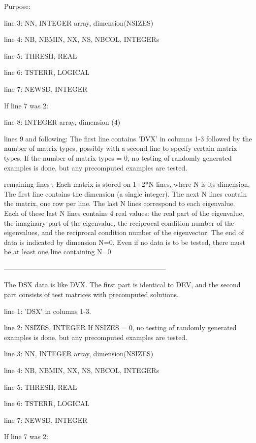 \begin{DoxyParagraph}{Purpose\+: }
\begin{DoxyVerb}
 line 3:  NN, INTEGER array, dimension(NSIZES)

 line 4:  NB, NBMIN, NX, NS, NBCOL, INTEGERs

 line 5:  THRESH, REAL

 line 6:  TSTERR, LOGICAL

 line 7:  NEWSD, INTEGER

 If line 7 was 2:

 line 8:  INTEGER array, dimension (4)

 lines 9 and following: The first line contains 'DVX' in columns 1-3
          followed by the number of matrix types, possibly with
          a second line to specify certain matrix types.
          If the number of matrix types = 0, no testing of randomly
          generated examples is done, but any precomputed examples
          are tested.

 remaining lines : Each matrix is stored on 1+2*N lines, where N is
          its dimension. The first line contains the dimension (a
          single integer). The next N lines contain the matrix, one
          row per line. The last N lines correspond to each
          eigenvalue. Each of these last N lines contains 4 real
          values: the real part of the eigenvalue, the imaginary
          part of the eigenvalue, the reciprocal condition number of
          the eigenvalues, and the reciprocal condition number of the
          eigenvector.  The end of data is indicated by dimension N=0.
          Even if no data is to be tested, there must be at least one
          line containing N=0.

-----------------------------------------------------------------------

 The DSX data is like DVX. The first part is identical to DEV, and the
 second part consists of test matrices with precomputed solutions.

 line 1:  'DSX' in columns 1-3.

 line 2:  NSIZES, INTEGER
          If NSIZES = 0, no testing of randomly generated examples
          is done, but any precomputed examples are tested.

 line 3:  NN, INTEGER array, dimension(NSIZES)

 line 4:  NB, NBMIN, NX, NS, NBCOL, INTEGERs

 line 5:  THRESH, REAL

 line 6:  TSTERR, LOGICAL

 line 7:  NEWSD, INTEGER

 If line 7 was 2:


\end{DoxyVerb}
\end{DoxyParagraph}
